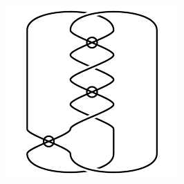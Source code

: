 \begin{figure}[H]
\begin{minipage}[b]{.18\linewidth}
\end{minipage}
\begin{minipage}[b]{.18\linewidth}
\centering
\includegraphics[width=\linewidth]{../data/virtual_4_81.png}
\end{minipage}
\end{figure}

